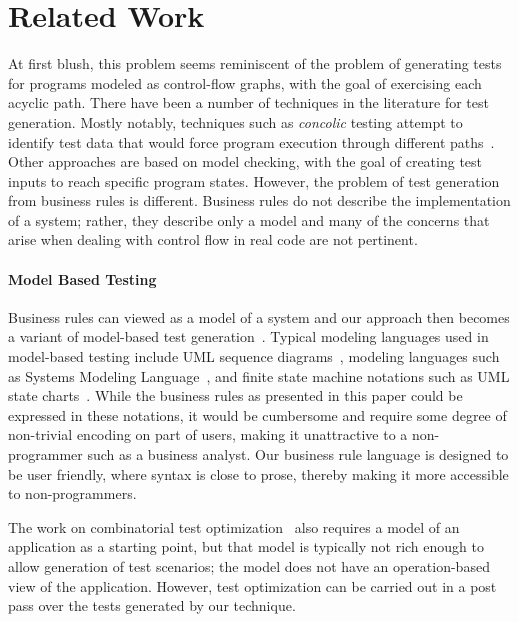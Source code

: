 \section{Related Work}
\label{sec:related}

At first blush, this problem seems reminiscent of the problem of generating
tests for programs modeled as control-flow graphs, with the goal of exercising
each acyclic path.  There have been a number of techniques in the literature for
test generation. Mostly notably, techniques such as \textit{concolic} testing
attempt to identify test data that would force program execution through
different paths~\cite{dart, concolic}.  Other approaches are based on model
checking, with the goal of creating test inputs to reach specific program
states.  However, the problem of test generation from business rules is
different. Business rules do not describe the implementation of a system;
rather, they describe only a model and many of the concerns that arise when
dealing with control flow in real code are not pertinent.

\paragraph*{Model Based Testing} Business rules can viewed as a model of a system
and our approach then becomes a variant of model-based test
generation~\cite{utting2012}.  Typical modeling languages used in model-based
testing include UML sequence diagrams~\cite{nayak2009}, modeling
languages such as Systems Modeling Language~\cite{friedenthal2011}, and
finite state machine notations such as UML state charts~\cite{offhut99}. While
the business rules as presented in this paper could be expressed in these
notations, it would be cumbersome and require some degree of non-trivial
encoding on part of users, making it unattractive to a non-programmer such as a
business analyst. Our business rule language is designed to be user friendly,
where syntax is close to prose, thereby making it more accessible to
non-programmers.


The work on combinatorial test optimization~\cite{segall2012} also requires a model 
of an application as a starting point, but that model is typically not rich
enough to allow generation of test scenarios; the model does not have an operation-based
view of the application.   However, test optimization 
can be carried out in a post pass over the tests generated by our technique.

